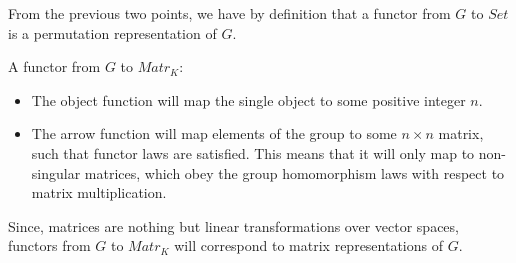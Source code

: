 From the previous two points, we have by definition that a functor from $G$ to $Set$ is a permutation representation of $G$.

\vspace{2mm}

A functor from $G$ to $Matr_K$:

\begin{itemize}
	\item The object function will map the single object to some positive integer $n$.
	\item The arrow function will map elements of the group to some $n \times n$ matrix, such that functor laws are satisfied. This means that it will only map to non-singular matrices, which obey the group homomorphism laws with respect to matrix multiplication.
\end{itemize}

Since, matrices are nothing but linear transformations over vector spaces, functors from $G$ to $Matr_K$ will correspond to matrix representations of $G$. 

\vspace{2mm}
